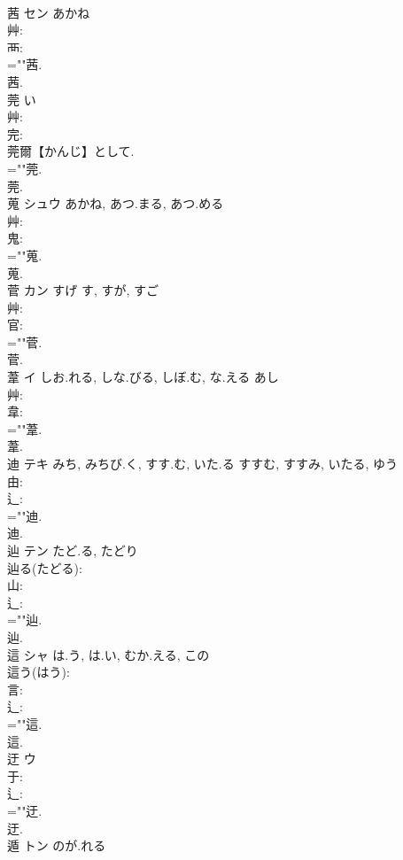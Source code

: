 \documentclass[8pt]{extreport}
\begin{document}
\begin{CJK}{UTF8}{min}
\\	茜	セン	あかね		
\\	艸: 
\\	襾: 
\\	=""茜.
\\	茜.
\\	莞		い				
\\	艸: 
\\	完: 
\\	莞爾【かんじ】として.
\\	=""莞.
\\	莞.
\\	蒐	シュウ	あかね, あつ.まる, あつ.める		
\\	艸: 
\\	鬼: 
\\	=""蒐.
\\	蒐.
\\	菅	カン	すげ	す, すが, すご	
\\	艸: 
\\	官: 
\\	=""菅.
\\	菅.
\\	葦	イ	しお.れる, しな.びる, しぼ.む, な.える	あし	
\\	艸: 
\\	韋: 
\\	=""葦.
\\	葦.
\\	迪	テキ	みち, みちび.く, すす.む, いた.る	すすむ, すすみ, いたる, ゆう	
\\	由: 
\\	辶: 
\\	=""迪.
\\	迪.
\\	辿	テン	たど.る, たどり		
\\	辿る(たどる): 
\\	山: 
\\	辶: 
\\	=""辿.
\\	辿.
\\	這	シャ	は.う, は.い, むか.える, この		
\\	這う(はう): 
\\	言: 
\\	辶: 
\\	=""這.
\\	這.
\\	迂	ウ			
\\	于: 
\\	辶: 
\\	=""迂.
\\	迂.
\\	遁	トン	のが.れる		

\end{CJK}
\end{document}
